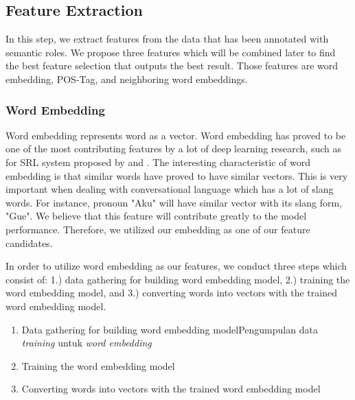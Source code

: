 \subsection{Feature Extraction}
In this step, we extract features from the data that has been annotated with semantic roles. We propose three features which will be combined later to find the best feature selection that outputs the best result. Those features are word embedding, POS-Tag, and neighboring word embeddings.

\subsubsection{Word Embedding}
Word embedding represents word as a vector. Word embedding has proved to be one of the most contributing features by a lot of deep learning research, such as for SRL system proposed by \cite{zhou2015end} and \cite{collobert2011natural}. The interesting characteristic of word embedding is that similar words have proved to have similar vectors. This is very important when dealing with conversational language which has a lot of slang words. For instance, pronoun "Aku" will have similar vector with its slang form, "Gue". We believe that this feature will contribute greatly to the model performance. Therefore, we utilized our embedding as one of our feature candidates.

In order to utilize word embedding as our features, we conduct three steps which consist of: 1.) data gathering for building word embedding model, 2.) training the word embedding model, and 3.) converting words into vectors with the trained word embedding model.

\begin{enumerate}
	\item Data gathering for building word embedding modelPengumpulan data \textit{training} untuk \textit{word embedding}\\
	
	\item Training the word embedding model\\
	
	\item Converting words into vectors with the trained word embedding model\\
	
\end{enumerate}


